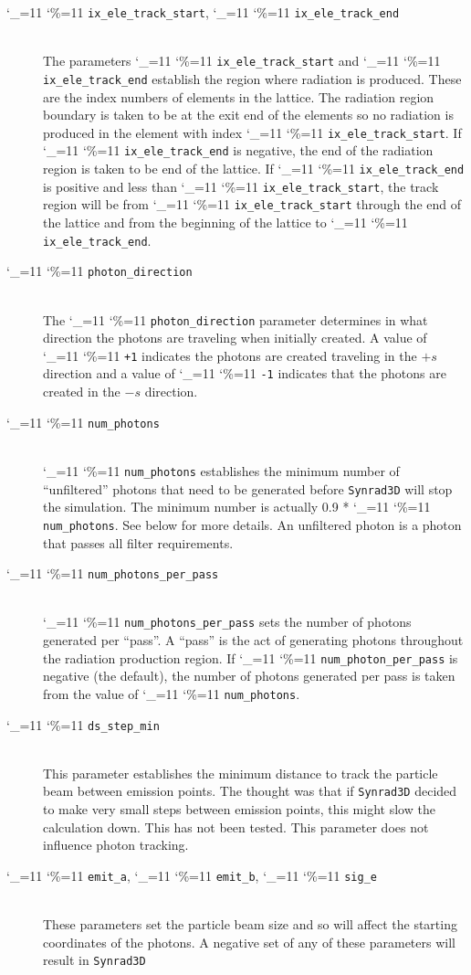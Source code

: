\documentclass[11pt]{article}
\newcommand{\srthree}{\texttt{Synrad3D}\xspace}
\newcommand\ttcmd{\begingroup\catcode`\_=11 \catcode`\%=11 \dottcmd}
\newcommand\dottcmd[1]{\texttt{#1}\endgroup}
\newcommand{\vn}{\ttcmd}
\newcommand{\Newline}{\hfil \\}
\begin{document}
  \begin{description}
  \item[\vn{ix_ele_track_start}, \vn{ix_ele_track_end}] \Newline
The parameters \vn{ix_ele_track_start} and \vn{ix_ele_track_end} establish
the region where radiation is produced. These are the index numbers of 
elements in the lattice. The radiation region boundary is taken to be at
the exit end of the elements so no radiation is produced in the element
with index \vn{ix_ele_track_start}. If \vn{ix_ele_track_end} is negative,
the end of the radiation region is taken to be end of the lattice.
If \vn{ix_ele_track_end} is positive and less than \vn{ix_ele_track_start},
the track region will be from \vn{ix_ele_track_start} through the
end of the lattice and from the beginning of the lattice to \vn{ix_ele_track_end}.
  \item[\vn{photon_direction}] \Newline
The \vn{photon_direction} parameter determines in what direction the photons
are traveling when initially created. A value of \vn{+1} indicates the photons
are created traveling in the $+s$ direction and a value of \vn{-1} indicates
that the photons are created in the $-s$ direction.
  \item[\vn{num_photons}] \Newline
\vn{num_photons} establishes the minimum number of ``unfiltered''
photons that need to be generated before \srthree will stop the
simulation. The minimum number is actually 0.9 * \vn{num_photons}. See
below for more details. An unfiltered photon is a photon that passes
all filter requirements.  
  \item[\vn{num_photons_per_pass}] \Newline
\vn{num_photons_per_pass} sets the number of photons generated per
``pass''.  A ``pass'' is the act of generating photons throughout the
radiation production region. If \vn{num_photon_per_pass} is negative
(the default), the number of photons generated per pass is taken from
the value of \vn{num_photons}.
  \item[\vn{ds_step_min}] \Newline
This parameter establishes the minimum distance to track the particle beam between emission
points. The thought was that if \srthree decided to make very small steps  between emission
points, this might slow the calculation down. This has not been tested. This parameter
does not influence photon tracking.
  \item[\vn{emit_a}, \vn{emit_b}, \vn{sig_e}] \Newline
These parameters set the particle beam size and so will affect the starting coordinates of
the photons. A negative set of any of these parameters will result in \srthree 

\end{description}
\end{document}
